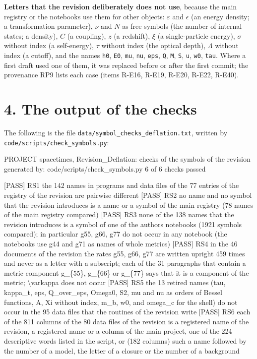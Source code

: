 \documentclass[
  10pt,
]{article}
\newenvironment{Shaded}{}{}
\newcommand{\NormalTok}[1]{#1}
\begin{document}
\textbf{Letters that the revision deliberately does not use}, because
the main registry or the notebooks use them for other objects:
\(\varepsilon\) and \(\epsilon\) (an energy density; a transformation
parameter), \(\nu\) and \(N\) as free symbols (the number of internal
states; a density), \(C\) (a coupling), \(z\) (a redshift), \(\xi\) (a
single-particle energy), \(\sigma\) without index (a self-energy),
\(\tau\) without index (the optical depth), \(\Lambda\) without index (a
cutoff), and the names \texttt{h0}, \texttt{E0}, \texttt{mu},
\texttt{nu}, \texttt{eps}, \texttt{Q}, \texttt{M}, \texttt{S},
\texttt{u}, \texttt{w0}, \texttt{tau}. Where a first draft used one of
them, it was replaced before or after the first commit; the provenance
RP9 lists each case (items R-E16, R-E19, R-E20, R-E22, R-E40).

\hypertarget{the-output-of-the-checks}{%
\section{4. The output of the checks}\label{the-output-of-the-checks}}

The following is the file \texttt{data/symbol\_checks\_deflation.txt},
written by \texttt{code/scripts/check\_symbols.py}:

\begin{Shaded}
\begin{Highlighting}[]
\NormalTok{PROJECT spacetimes, Revision\_Deflation: checks of the symbols of the revision}
\NormalTok{generated by: code/scripts/check\_symbols.py}
\NormalTok{6 of 6 checks passed}

\NormalTok{[PASS] RS1  the 142 names in programs and data files of the 77 entries of the registry of the revision are pairwise different}
\NormalTok{[PASS] RS2  no name and no symbol that the revision introduces is a name or a symbol of the main registry (78 names of the main registry compared)}
\NormalTok{[PASS] RS3  none of the 138 names that the revision introduces is a symbol of one of the author\textquotesingle{}s notebooks (1921 symbols compared); in particular g55, g66, g77 do not occur in any notebook (the notebooks use g44 and g71 as names of whole metrics)}
\NormalTok{[PASS] RS4  in the 46 documents of the revision the rates g55, g66, g77 are written upright 459 times and never as a letter with a subscript; each of the 31 paragraphs that contain a metric component g\_\{55\}, g\_\{66\} or g\_\{77\} says that it is a component of the metric; \textbackslash{}varkappa does not occur}
\NormalTok{[PASS] RS5  the 13 retired names (tau, kappa\_t, eps, Q\_over\_eps, Omega0, S2, mu and nu as orders of Bessel functions, A, Xi without index, m\_b, w0, and omega\_c for the shell) do not occur in the 95 data files that the routines of the revision write}
\NormalTok{[PASS] RS6  each of the 811 columns of the 80 data files of the revision is a registered name of the revision, a registered name or a column of the main project, one of the 224 descriptive words listed in the script, or (182 columns) such a name followed by the number of a model, the letter of a closure or the number of a background}
\end{Highlighting}
\end{Shaded}
\end{document}
